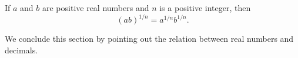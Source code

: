 \begin{myCorollary*}
    If $a$ and $b$ are positive real numbers
    and $n$ is a positive integer,
    then
    \begin{equation*}
        (ab)^{1/n}= a^{1/n}b^{1/n}.
    \end{equation*}
\end{myCorollary*}

\begin{mydef}
    \label{mydef:1.22}
    We conclude this section by pointing out the relation between real numbers and decimals.
\end{mydef}


